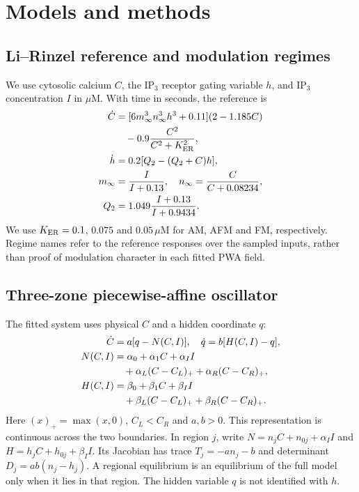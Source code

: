 \documentclass[final,5p,times,twocolumn]{elsarticle}
\begin{document}
\section{Models and methods}
\label{sec:methods}

\subsection{Li--Rinzel reference and modulation regimes}
We use cytosolic calcium $C$, the IP$_3$ receptor gating variable $h$, and
IP$_3$ concentration $I$ in $\mu$M. With time in seconds, the reference is
\begin{align}
\dot C &= [6 m_\infty^3 n_\infty^3 h^3+0.11](2-1.185C)\notag\\
       &\quad -0.9\frac{C^2}{C^2+K_{\rm ER}^2},\\
\dot h &=0.2[Q_2-(Q_2+C)h],\notag\\
m_\infty&=\frac{I}{I+0.13},\quad n_\infty=\frac{C}{C+0.08234},\notag\\
Q_2&=1.049\frac{I+0.13}{I+0.9434}.\notag
\end{align}
We use $K_{\rm ER}=0.1$, $0.075$ and $0.05\,\mu$M for AM, AFM and FM,
respectively. Regime names refer to the reference responses over the sampled
inputs, rather than proof of modulation character in each fitted PWA field.



\subsection{Three-zone piecewise-affine oscillator}
The fitted system uses physical $C$ and a hidden coordinate $q$:
\begin{align}
\dot C&=a[q-N(C,I)],\quad \dot q=b[H(C,I)-q],\\
N(C,I)&=\alpha_0+\alpha_1 C+\alpha_I I\notag\\
       &\quad +\alpha_L(C-C_L)_++\alpha_R(C-C_R)_+,\notag\\
H(C,I)&=\beta_0+\beta_1 C+\beta_I I\notag\\
       &\quad +\beta_L(C-C_L)_++\beta_R(C-C_R)_+.\notag
\end{align}
Here $(x)_+=\max(x,0)$, $C_L<C_R$ and $a,b>0$. This representation is continuous
across the two boundaries. In region $j$, write $N=n_j C+n_{0j}+\alpha_I I$
and $H=h_j C+h_{0j}+\beta_I I$. Its Jacobian has trace
$T_j=-a n_j-b$ and determinant $D_j=ab(n_j-h_j)$. A regional equilibrium
is an equilibrium of the full model only when it lies in that region.
The hidden variable $q$ is not identified with $h$.
\end{document}
